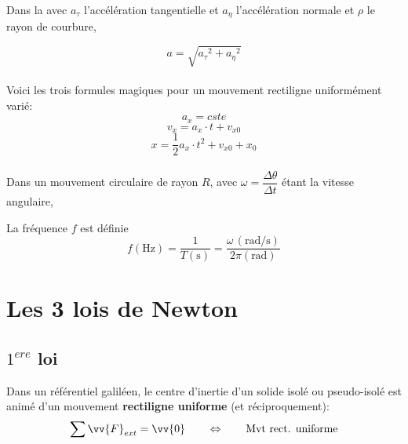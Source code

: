 \begin{Definition}

Dans la  avec $a_{\tau}$ l'accélération tangentielle et $a_{\eta}$ l'accélération normale et $\rho$ le rayon de courbure,


$$a=\sqrt{{a_{\tau}}^2 + {a_{\eta}}^2}$$\\

Voici les trois formules magiques pour un mouvement rectiligne uniformément varié:
$$a_{x}=cste $$
$$v_{x}=a_{x}\cdot t +v_{x0}$$
$$x=\frac{1}{2}a_{x}\cdot t^2 + v_{x0} +x_{0} $$\\

Dans un mouvement circulaire de rayon $R$, avec $\omega = \dfrac{\Delta \theta}{\Delta t}$ étant la vitesse angulaire,\\



La fréquence $f$ est définie
$$f(\text{Hz}) = \dfrac{1}{T(\text{s})} = \dfrac{\omega\, (\text{rad/s})}{2\pi(\text{rad})}$$
\end{Definition}


\section{Les 3 lois de Newton}

\subsection{$1^{ere}$ loi}

\begin{Definition}
Dans un référentiel galiléen, le centre d'inertie d'un solide isolé ou pseudo-isolé est animé d'un mouvement \textbf{rectiligne uniforme} (et réciproquement):
$$\sum \vv{F}_{ext} = \vv{0} \qquad \Leftrightarrow \qquad \text{Mvt rect. uniforme}$$
\end{Definition}

